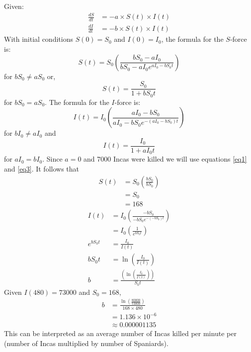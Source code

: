 \documentclass[letterpaper,10pt]{article}
\begin{document}
Given:
\begin{align*}
\frac{dS}{dt} &= -a\times S(t)\times I(t) \\
\frac{dI}{dt} &= -b\times S(t)\times I(t)
\end{align*}
With initial conditions $S(0) = S_{0}$ and $I(0) = I_{0}$, the formula for the $S$-force is:
\begin{equation}\label{eq1}
S(t) = S_{0}\left(\frac{bS_{0}-aI_{0}}{bS_{0}-aI_{0}e^{aI_{0}-bS_{0}t}} \right)
\end{equation}
for $bS_{0}\neq aS_{0}$ or,
\begin{equation}\label{eq2}
S(t) = \frac{S_{0}}{1+bS_{0}t}
\end{equation}
for $bS_{0}=aS_{0}$.  The formula for the $I$-force is:
\begin{equation}\label{eq3}
I(t) = I_{0}\left(\frac{aI_{0}-bS_{0}}{aI_{0}-bS_{0}e^{-(aI_{0}-bS_{0})t}} \right)
\end{equation}
for $bI_{0}\neq aI_{0}$ and
\begin{equation}\label{eq4}
I(t) = \frac{I_{0}}{1+aI_{0}t}
\end{equation}
for $aI_{0} = bI_{0}$.  Since $a=0$ and 7000 Incas were killed we will use equations \eqref{eq1} and \eqref{eq3}.  It follows that
\begin{align*}
S(t) &= S_{0}\left(\frac{bS_{0}}{bS_{0}} \right) \\
&= S_{0} \\
&= 168
\end{align*}
\begin{align*}
I(t) &= I_{0}\left(\frac{-bS_{0}}{-bS_{0}e^{-(-bS_{0})t}} \right) \\
&= I_{0}\left(\frac{1}{e^{bS_{0}t}} \right) \\
e^{bS_{0}t} &= \frac{I_{0}}{I(t)} \\
bS_{0}t &= \ln\left(\frac{I_{0}}{I(t)} \right) \\
b &= \frac{\left(\ln\left(\frac{I_{0}}{I(t)}\right) \right)}{S_{0}t}
\end{align*}
Given $I(480) = 73000$ and $S_{0} = 168$,
\begin{align*}
b &= \frac{\ln\left(\frac{80000}{73000} \right)}{168\times 480} \\
&= 1.136\times 10^{-6} \\
&\approx 0.000001135
\end{align*}
This can be interpreted as an average number of Incas killed per minute per (number of Incas multiplied by number of Spaniards).
\end{document}
